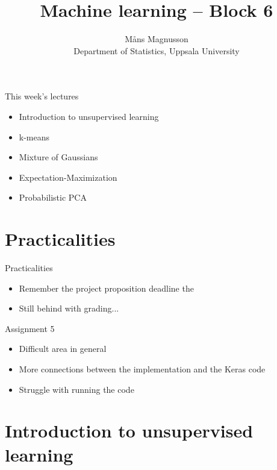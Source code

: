 \documentclass[10pt]{beamer}
\title[]{{\color{black}Machine learning -- Block 6}}
\author[]{M{\aa}ns Magnusson\\Department of Statistics, Uppsala University}
\date{\currentsemester}
\begin{document}
\frame{\titlepage
}



\begin{frame}{This week's lectures}
\begin{itemize}
\item Introduction to unsupervised learning
\item k-means
\item Mixture of Gaussians
\item Expectation-Maximization
\item Probabilistic PCA
\end{itemize}
\end{frame}





\section{Practicalities}

\begin{frame}{Practicalities}

\begin{itemize}
\item Remember the project proposition deadline the 
\item Still behind with grading...
\end{itemize}

\end{frame}

\begin{frame}{Assignment 5}

\begin{itemize}
\item Difficult area in general
\item More connections between the implementation and the Keras code
\item Struggle with running the code
\end{itemize}

\end{frame}


\section{Introduction to unsupervised learning}
\frame{\sectionpage}
\end{document}
